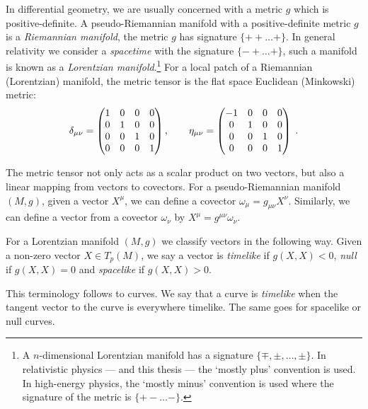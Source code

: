In differential geometry, we are usually concerned with a metric $g$ which is positive-definite. A pseudo-Riemannian manifold with a positive-definite metric $g$ is a \emph{Riemannian manifold}, \ie the metric $g$ has signature $\{++ \ldots + \}$. In general relativity we consider a \emph{spacetime} with the signature $\{-+ \ldots + \}$, such a manifold is known as a \emph{Lorentzian manifold}.\footnote{A $n$-dimensional Lorentzian manifold has a signature $\{\mp, \pm, \ldots, \pm\}$. In relativistic physics --- and this thesis --- the `mostly plus' convention is used. In high-energy physics, the `mostly minus' convention is used where the signature of the metric is $\{+- \ldots - \}$.} For a local patch of a Riemannian (Lorentzian) manifold, the metric tensor is the flat space Euclidean (Minkowski) metric:
\begin{equation*}
	\delta_{\mu \nu} = \begin{pmatrix} 1 & 0 & 0 & 0 \\ 0 & 1 & 0 & 0 \\ 0 & 0 & 1 & 0 \\ 0 & 0 & 0 & 1\end{pmatrix}, \qquad \eta_{\mu \nu} = \begin{pmatrix} -1 & 0 & 0 & 0 \\ 0 & 1 & 0 & 0 \\ 0 & 0 & 1 & 0 \\ 0 & 0 & 0 & 1\end{pmatrix} \;.
\end{equation*}

The metric tensor not only acts as a scalar product on two vectors, but also a linear mapping from vectors to covectors. For a pseudo-Riemannian manifold $(M, g)$, given a vector $X^\mu$, we can define a covector $\omega_\mu = g_{\mu \nu} X^\nu$. Similarly, we can define a vector from  a covector $\omega_\nu$ by $X^\mu = g^{\mu \nu} \omega_\nu$.

\begin{defn}
For a Lorentzian manifold $(M,g)$ we classify vectors in the following way. Given a non-zero vector $X \in T_p(M)$, we say a vector is \emph{timelike} if $g(X,X) < 0$, \emph{null} if $g(X,X) = 0$ and \emph{spacelike} if $g(X,X) > 0$.
\end{defn}
This terminology follows to curves. We say that a curve is \emph{timelike} when the tangent vector to the curve is everywhere timelike. The same goes for spacelike or null curves.

